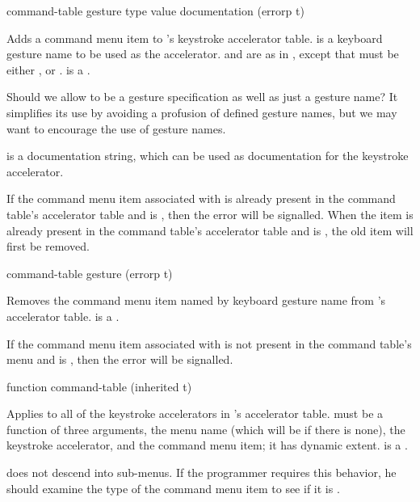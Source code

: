  {command-table gesture type value
                                         \key documentation (errorp t)}

Adds a command menu item to 's keystroke accelerator table.
 is a keyboard gesture name to be used as the accelerator.
 and  are as in , except
that  must be either ,  or .
 is a .

 {Should we allow  to be a gesture specification as
well as just a gesture name?  It simplifies its use by avoiding a profusion of
defined gesture names, but we may want to encourage the use of gesture names.}

 is a documentation string, which can be used as
documentation for the keystroke accelerator.

If the command menu item associated with  is already present in the
command table's accelerator table and  is , then the
 error will be signalled.  When the item is already
present in the command table's accelerator table and  is
, the old item will first be removed.


 {command-table gesture \key (errorp t)}

Removes the command menu item named by keyboard gesture name  from
's accelerator table.   is a .

If the command menu item associated with  is not present in the
command table's menu and  is , then the
 error will be signalled.


 {function command-table \key (inherited t)}

Applies  to all of the keystroke accelerators in
's accelerator table.   must be a function of
three arguments, the menu name (which will be  if there is none), the
keystroke accelerator, and the command menu item; it has dynamic extent.
 is a .

 does not descend into sub-menus.  If the
programmer requires this behavior, he should examine the type of the command
menu item to see if it is .

